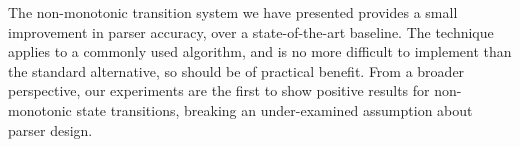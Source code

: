 \documentclass[11pt,letterpaper]{article}
\begin{document}
The non-monotonic transition system we have presented provides a small improvement
in parser accuracy, over a state-of-the-art baseline. The technique applies to
a commonly used algorithm, and is no more difficult to implement than the standard
alternative, so should be of practical benefit. From a broader perspective, our
experiments are the first to show positive results for non-monotonic state transitions,
breaking an under-examined assumption about parser design.







\end{document}
